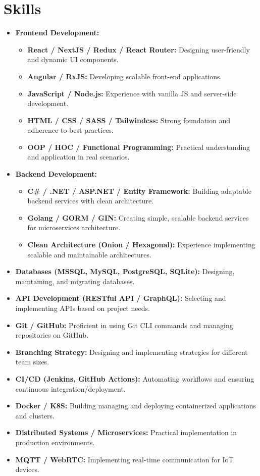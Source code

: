 \section{Skills}
\begin{itemize}[leftmargin=3em, label={$\bullet$}]
    \item \textbf{Frontend Development:}  
        \begin{itemize}
            \item \textbf{React / NextJS / Redux / React Router:} Designing user-friendly and dynamic UI components.
            \item \textbf{Angular / RxJS:} Developing scalable front-end applications.
            \item \textbf{JavaScript / Node.js:} Experience with vanilla JS and server-side development.
            \item \textbf{HTML / CSS / SASS / Tailwindcss:} Strong foundation and adherence to best practices.
            \item \textbf{OOP / HOC / Functional Programming:} Practical understanding and application in real scenarios.
        \end{itemize}
    \item \textbf{Backend Development:}  
        \begin{itemize}
            \item \textbf{C\# / .NET / ASP.NET / Entity Framework:} Building adaptable backend services with clean architecture.
            \item \textbf{Golang / GORM / GIN:} Creating simple, scalable backend services for microservices architecture.
            \item \textbf{Clean Architecture (Onion / Hexagonal):} Experience implementing scalable and maintainable architectures.
        \end{itemize}
    \item \textbf{Databases (MSSQL, MySQL, PostgreSQL, SQLite):} Designing, maintaining, and migrating databases.
    \item \textbf{API Development (RESTful API / GraphQL):} Selecting and implementing APIs based on project needs.
    \item \textbf{Git / GitHub:} Proficient in using Git CLI commands and managing repositories on GitHub.
    \item \textbf{Branching Strategy:} Designing and implementing strategies for different team sizes.
    \item \textbf{CI/CD (Jenkins, GitHub Actions):} Automating workflows and ensuring continuous integration/deployment.
    \item \textbf{Docker / K8S:} Building managing and deploying containerized applications and clusters.
    \item \textbf{Distributed Systems / Microservices:} Practical implementation in production environments.
    \item \textbf{MQTT / WebRTC:} Implementing real-time communication for IoT devices.
\end{itemize}
